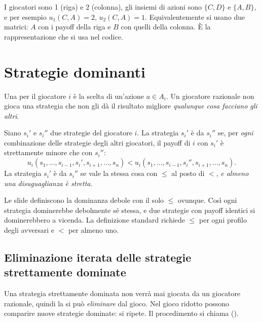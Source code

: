I giocatori sono 1 (riga) e 2 (colonna), gli insiemi di azioni sono $\{C,D\}$ e
$\{A,B\}$, e per esempio $u_1(C,A) = 2$, $u_2(C,A) = 1$. Equivalentemente si usano due
matrici: $A$ con i payoff della riga e $B$ con quelli della colonna. È la rappresentazione
che si usa nel codice.

\section{Strategie dominanti}

Una  per il giocatore $i$ è la scelta di un'azione $a \in A_i$.
Un giocatore razionale non gioca una strategia che non gli dà il risultato migliore
\emph{qualunque cosa facciano gli altri}.

\begin{definizione}
Siano $s_i'$ e $s_i''$ due strategie del giocatore $i$. La strategia $s_i'$ è
 da $s_i''$ se, per \emph{ogni} combinazione delle strategie degli
altri giocatori, il payoff di $i$ con $s_i'$ è strettamente minore che con $s_i''$:
\[
  u_i(s_1,\dots,s_{i-1}, s_i', s_{i+1},\dots,s_n) <
  u_i(s_1,\dots,s_{i-1}, s_i'', s_{i+1},\dots,s_n).
\]
La strategia $s_i'$ è  da $s_i''$ se vale la stessa cosa con
$\le$ al posto di $<$, \emph{e almeno una disuguaglianza è stretta}.
\end{definizione}

\begin{attenzione}
Le slide definiscono la dominanza debole con il solo $\le$ ovunque. Così ogni strategia
dominerebbe debolmente sé stessa, e due strategie con payoff identici si dominerebbero a
vicenda. La definizione standard richiede $\le$ per ogni profilo degli avversari e $<$ per
almeno uno.
\end{attenzione}

\subsection{Eliminazione iterata delle strategie strettamente dominate}

Una strategia strettamente dominata non verrà mai giocata da un giocatore razionale, quindi
la si può \emph{eliminare} dal gioco. Nel gioco ridotto possono comparire nuove strategie
dominate: si ripete. Il procedimento si chiama  ().

